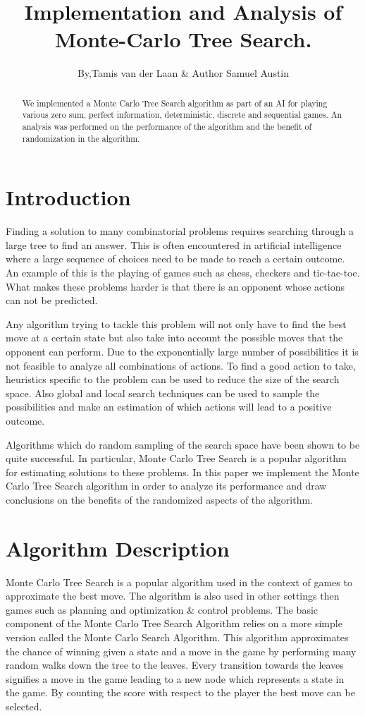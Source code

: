 \documentclass[compressed,final,notitlepage,narroweqnarray,inline,twoside,]{ieee}
\title{Implementation and Analysis of Monte-Carlo Tree Search.}
\author{By,Tamis van der Laan \& Author Samuel Austin }
\begin{document}
\maketitle

\begin{abstract}
We implemented a Monte Carlo Tree Search algorithm as part of an AI for playing various zero sum, perfect information, deterministic, discrete and sequential games. An analysis was performed on the performance of the algorithm and the benefit of randomization in the algorithm.
\end{abstract}

\section{Introduction}
Finding a solution to many combinatorial problems requires searching through a large tree to find an answer. This is often encountered in artificial intelligence where a large sequence of choices need to be made to reach a certain outcome. An example of this is the playing of games such as chess, checkers and tic-tac-toe. What makes these problems harder is that there is an opponent whose actions can not be predicted.

Any algorithm trying to tackle this problem will not only have to find the best move at a certain state but also take into account the possible moves that the opponent can perform. Due to the exponentially large number of possibilities it is not feasible to analyze all combinations of actions. To find a good action to take, heuristics specific to the problem can be used to reduce the size of the search space. Also global and local search techniques can be used to sample the possibilities and make an estimation of which actions will lead to a positive outcome.

Algorithms which do random sampling of the search space have been shown to be quite successful. In particular, Monte Carlo Tree Search is a popular algorithm for estimating solutions to these problems. In this paper we implement the Monte Carlo Tree Search algorithm in order to analyze its performance and draw conclusions on the benefits of the randomized aspects of the algorithm.

\section{Algorithm Description}
Monte Carlo Tree Search is a popular algorithm used in the context of games to approximate the best move.\cite{MCTS} The algorithm is also used in other settings then games such as planning and optimization \& control problems. The basic component of the Monte Carlo Tree Search Algorithm relies on a more simple version called the Monte Carlo Search Algorithm. This algorithm approximates the chance of winning given a state and a move in the game by performing many random walks down the tree to the leaves. Every transition towards the leaves signifies a move in the game leading to a new node which represents a state in the game. By counting the score with respect to the player the best move can be selected.
\end{document}
